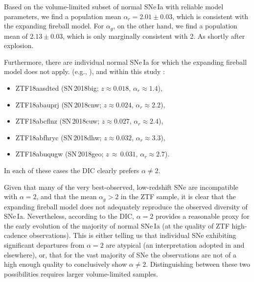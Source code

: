 \documentclass[twocolumn]{./aastex63}
\begin{document}
Based on the volume-limited subset of normal SNe\,Ia with reliable model
parameters, we find a population mean $\alpha_r = 2.01 \pm 0.03$, which is
consistent with the expanding fireball model. For $\alpha_g$, on the other
hand, we find a population mean of $2.13 \pm 0.03$, which is only marginally
consistent with 2. As  shortly after explosion.

Furthermore, there are individual normal SNe\,Ia for which the expanding
fireball model does not apply.  (e.g.,
\citealt{Zheng13,Zheng14,Goobar15,Miller18,Shappee19,Dimitriadis19}), and
within this study :
% 
\begin{itemize}
\item ZTF18aasdted (SN\,2018big; $z \approx 0.018$, $\alpha_r \approx 1.4$),
\item ZTF18abauprj (SN\,2018cnw; $z \approx 0.024$, $\alpha_r \approx 2.2$),
\item ZTF18abcflnz (SN\,2018cuw; $z \approx 0.027$, $\alpha_r \approx 2.4$),
\item ZTF18abfhryc (SN\,2018dhw; $z \approx 0.032$, $\alpha_r \approx 3.3$), 
\item ZTF18abuqugw (SN\,2018geo; $z\,\approx\,0.031$, $\alpha_r\approx2.7$).
\end{itemize}
% 
In each of these cases the DIC clearly prefers $\alpha \neq 2$.

Given that many of the very best-observed, low-redshift SNe are incompatible
with $\alpha = 2$, and that the mean $\alpha_g > 2$ in the ZTF sample, it is
clear that the expanding fireball model does not adequately reproduce the
observed diversity of SNe\,Ia. Nevertheless, according to the
DIC, $\alpha=2$ provides a reasonable proxy for the early evolution of the
majority of normal SNe\,Ia (at the quality of ZTF high-cadence observations).
This is either telling us that individual SNe exhibiting significant
departures from $\alpha = 2$ are atypical (an interpretation adopted in
\citealt{Hosseinzadeh17,Miller18,Dimitriadis19} and elsewhere), or, that for
the vast majority of SNe the observations are not of a high enough quality to
conclusively show $\alpha \neq 2$. Distinguishing between these two
possibilities requires larger volume-limited samples.
\end{document}
